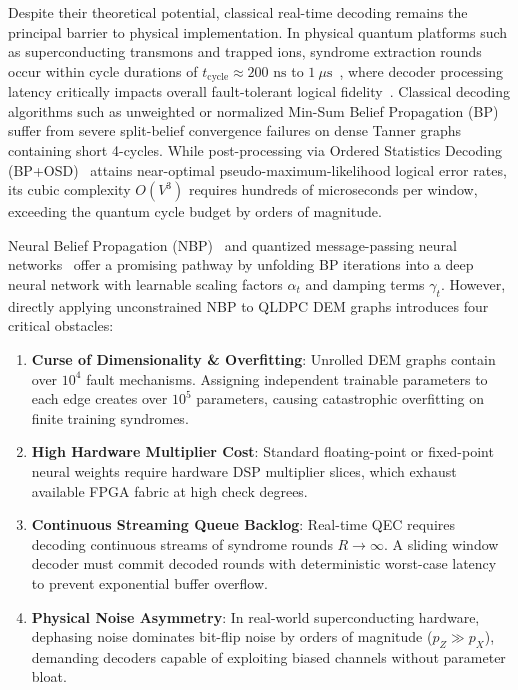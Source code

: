 \documentclass[journal]{IEEEtran}
\begin{document}
Despite their theoretical potential, classical real-time decoding remains the principal barrier to physical implementation. In physical quantum platforms such as superconducting transmons and trapped ions, syndrome extraction rounds occur within cycle durations of $t_{\text{cycle}} \approx 200\text{ ns}$ to $1~\mu\text{s}$~\cite{bravyi2024high}, where decoder processing latency critically impacts overall fault-tolerant logical fidelity~\cite{khalid2025impacts}. Classical decoding algorithms such as unweighted or normalized Min-Sum Belief Propagation (BP)~\cite{roffe2020decoding,chen2002near} suffer from severe split-belief convergence failures on dense Tanner graphs containing short 4-cycles. While post-processing via Ordered Statistics Decoding (BP+OSD)~\cite{roffe2020decoding,panteleev2021degenerate,fossorier1995soft} attains near-optimal pseudo-maximum-likelihood logical error rates, its cubic complexity $O(V^3)$ requires hundreds of microseconds per window, exceeding the quantum cycle budget by orders of magnitude.

Neural Belief Propagation (NBP)~\cite{nachmani2018deep,liu2019neural} and quantized message-passing neural networks~\cite{buchberger2021pruning,geiselhart2023learning,esser2020learned,rabeti2026multiple} offer a promising pathway by unfolding BP iterations into a deep neural network with learnable scaling factors $\alpha_t$ and damping terms $\gamma_t$. However, directly applying unconstrained NBP to QLDPC DEM graphs introduces four critical obstacles:
\begin{enumerate}
    \item \textbf{Curse of Dimensionality \& Overfitting}: Unrolled DEM graphs contain over $10^4$ fault mechanisms. Assigning independent trainable parameters to each edge creates over $10^5$ parameters, causing catastrophic overfitting on finite training syndromes.
    \item \textbf{High Hardware Multiplier Cost}: Standard floating-point or fixed-point neural weights require hardware DSP multiplier slices, which exhaust available FPGA fabric at high check degrees.
    \item \textbf{Continuous Streaming Queue Backlog}: Real-time QEC requires decoding continuous streams of syndrome rounds $R \to \infty$. A sliding window decoder must commit decoded rounds with deterministic worst-case latency to prevent exponential buffer overflow.
    \item \textbf{Physical Noise Asymmetry}: In real-world superconducting hardware, dephasing noise dominates bit-flip noise by orders of magnitude ($p_Z \gg p_X$), demanding decoders capable of exploiting biased channels without parameter bloat.
\end{enumerate}
\end{document}
